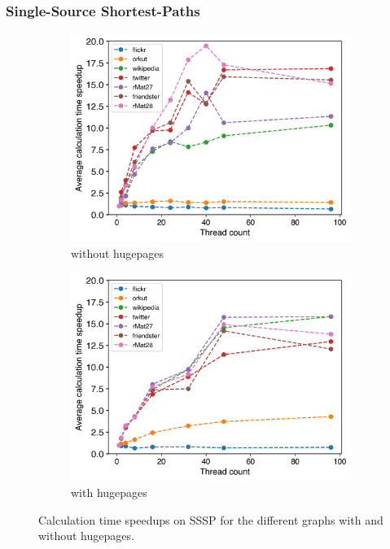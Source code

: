 \subsubsection{Single-Source Shortest-Paths}
\begin{figure}
	\hfil
	\begin{subfigure}{0.32\textwidth}
		\includegraphics[width=\linewidth]{../../plots/singleNodeSSSPGaloisThreads.png}
		\caption{without hugepages}
		\label{fig:galoisSpeedupSSSP_noHP}
	\end{subfigure}
	\hfil
	\begin{subfigure}{0.32\textwidth}
		\includegraphics[width=\linewidth]{../../plots/singleNodeSSSPGaloisHPThreads.png}
		\caption{with hugepages}
		\label{fig:galoisSpeedupSSSP_HP}
	\end{subfigure}
	\hfil
	\caption{Calculation time speedups on SSSP for the different graphs with and without hugepages.}
	\label{fig:galoisSpeedupSSSP}
\end{figure}
